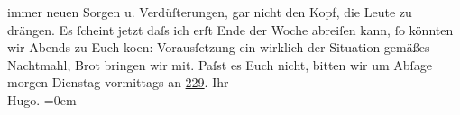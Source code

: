                immer neuen Sorgen u. Verdüſterungen, gar nicht den Kopf, {\pb}die Leute zu drängen.\pend
           \pstart
           Es ſcheint jetzt daſs ich erſt Ende der Woche abreiſen kann, ſo könnten wir \label{K_L02254_2v}\label{K_L02254_2h}{ }Abends zu Euch ko{\geminationm}en: Vorausſetzung ein
               wirklich der Situation gemäßes Nachtmahl, Brot bringen wir mit.\pend
           \pstart
           Paſst es Euch nicht, bitten wir um Abſage morgen Dienstag{ }vormittags an \uline{229}.\pend
           \pstart
           Ihr{\\[\baselineskip]}\spacefill\mbox{Hugo.}\pend
           \leftskip=0em{}\endnumbering{}  
      